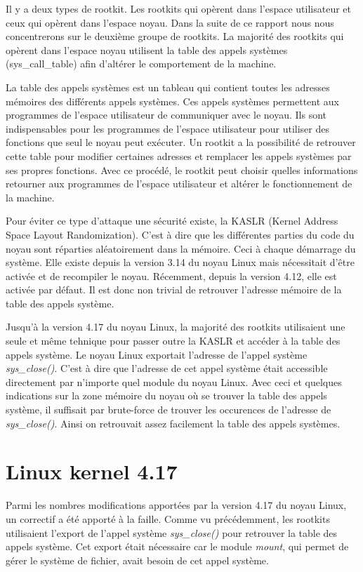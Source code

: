 \documentclass[journal, a4paper]{IEEEtran}
\begin{document}
Il y a deux types de rootkit. Les rootkits qui opèrent dans l'espace utilisateur et ceux qui opèrent dans l'espace noyau. Dans la suite de ce rapport nous nous concentrerons sur le deuxième groupe de rootkits. La majorité des rootkits qui opèrent dans l'espace noyau utilisent la table des appels systèmes (sys\_call\_table) afin d'altérer le comportement de la machine.

La table des appels systèmes est un tableau qui contient toutes les adresses mémoires des différents appels systèmes. Ces appels systèmes permettent aux programmes de l'espace utilisateur de communiquer avec le noyau. Ils sont indispensables pour les programmes de l'espace utilisateur pour utiliser des fonctions que seul le noyau peut exécuter. Un rootkit a la possibilité de retrouver cette table pour modifier certaines adresses et remplacer les appels systèmes par ses propres fonctions. Avec ce procédé, le rootkit peut choisir quelles informations retourner aux programmes de l'espace utilisateur et altérer le fonctionnement de la machine.

Pour éviter ce type d'attaque une sécurité existe, la  KASLR (Kernel Address Space Layout Randomization). C'est à dire que les différentes parties du code du noyau sont réparties aléatoirement dans la mémoire. Ceci à chaque démarrage du système. Elle existe depuis la version 3.14 du noyau Linux mais nécessitait d'être activée et de recompiler le noyau. Récemment, depuis la version 4.12, elle est activée par défaut. Il est donc non trivial de retrouver l'adresse mémoire de la table des appels système.

Jusqu'à la version 4.17 du noyau Linux, la majorité des rootkits utilisaient une seule et même tehnique pour passer outre la KASLR et accéder à la table des appels système. Le noyau Linux exportait l'adresse de l'appel système \textit{sys\_close()}. C'est à dire que l'adresse de cet appel système était accessible directement par n'importe quel module du noyau Linux. Avec ceci et quelques indications sur la zone mémoire du noyau où se trouver la table des appels système, il suffisait par brute-force de trouver les occurences de l'adresse de \textit{sys\_close()}. Ainsi on retrouvait assez facilement la table des appels systèmes.

\section{Linux kernel 4.17}

Parmi les nombres modifications apportées par la version 4.17 du noyau Linux, un correctif a été apporté à la faille. Comme vu précédemment, les rootkits utilisaient l'export de l'appel système \textit{sys\_close()} pour retrouver la table des appels système. Cet export était nécessaire car le module \textit{mount}, qui permet de gérer le système de fichier, avait besoin de cet appel système.
\end{document}
